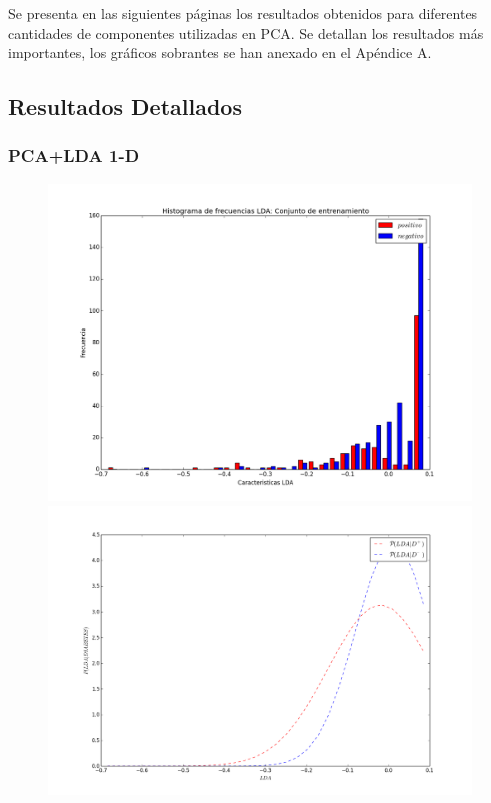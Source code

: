\documentclass[letter, titlepage, 10pt]{article}
\begin{document}
Se presenta en las siguientes páginas los resultados obtenidos para diferentes cantidades de componentes utilizadas en PCA. Se detallan los resultados más importantes, los gráficos sobrantes se han anexado en el Apéndice A.

\subsection{Resultados Detallados}
\subsubsection{PCA+LDA 1-D}
  \begin{figure}[H]
  \centering
    \begin{minipage}{.5\textwidth}
        \centering
        \includegraphics[width=1\linewidth]{images/Histograma_D1}
    \end{minipage}%
    \begin{minipage}{.5\textwidth}
        \centering
        \includegraphics[width=1\linewidth]{images/PDF_D1}

\end{minipage}
\end{figure}
\end{document}
